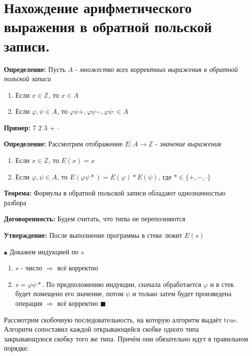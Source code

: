 \setcounter{section}{9}
\section{Нахождение арифметического выражения в обратной польской записи.}
\par \textbf{Определение:} Пусть $A$ - \textit{множество всех корректных выражения в обратной польской записи}
\begin{enumerate}
    \item Если $x \in \mathbb{Z}$, то $x \in A$
    \item Если $\varphi, \psi \in A$, то $\varphi\psi+, \varphi\psi-, \varphi\psi\cdot \in A$
\end{enumerate}
\par \textbf{Пример:} 7 2 3 + $\cdot$
\par \textbf{Определение:} Рассмотрим отображение $E: A \rightarrow \mathbb{Z}$ - \textit{значение выражения} \begin{enumerate}
    \item Если $x \in \mathbb{Z}$, то $E(x)=x$
    \item Если $\varphi, \psi \in A$, то $E(\varphi\psi *)=E(\varphi)* E(\psi)$, где $* \in \{+, -, \cdot \}$
\end{enumerate} 
\par \textbf{Теорема:} Формулы в обратной польской записи обладают однозначностью разбора
\par \textbf{Договоренность:} Будем считать, что типы не переполняются

\par \textbf{Утверждение:} После выполнение программы в стеке лежит $E(s)$
\par $\blacktriangle$ Докажем индукцией по $s$ \begin{enumerate}
    \item $s$ - число $\Rightarrow$ всё корректно
    \item $s=\varphi\psi *$. По предположению индукции, сначала обработается $\varphi$ и в стек будет помещено его значение, потом $\psi$ и только затем будет произведена операция $\Rightarrow$ всё корректно $\blacksquare$
\end{enumerate}

Рассмотрим скобочную последовательность, на которую алгоритм выдаёт true. Алгоритм сопоставил каждой открывающейся скобке одного типа закрывающуюся скобку того же типа. Причём они обязательно идут в правильном порядке. 

